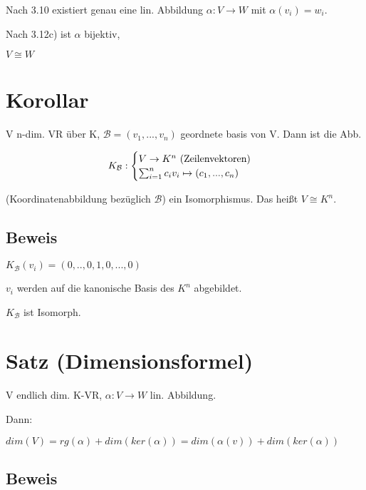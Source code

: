 \documentclass[a4paper, openany]{book}
\begin{document}
        Nach 3.10 existiert genau eine lin. Abbildung $\alpha : V \rightarrow W$ mit $\alpha(v_i) = w_i$.

        Nach 3.12c) ist $\alpha$ bijektiv,

        \begin{center}
          $V \cong W$
        \end{center}



        \section{Korollar}

        V n-dim. VR über K, $\mathcal{B} = (v_1, ..., v_n)$ geordnete basis von V. Dann ist die Abb. 

        \begin{equation}
          K_{\mathcal{B}} : \begin{cases}V \rightarrow K^n \textnormal{ (Zeilenvektoren)}\\ \sum_{i=1}^n c_i v_i \mapsto (c_1, ..., c_n) \end{cases}
        \end{equation}

        (Koordinatenabbildung bezüglich $\mathcal{B}$) ein Isomorphismus. Das heißt $V \cong K^n$.

        \subsection{Beweis}

        $K_{\mathcal{B}}(v_i) = (0,..,0,1,0,...,0)$

        $v_i$ werden auf die kanonische Basis des $K^n$ abgebildet.

        $K_{\mathcal{B}}$ ist Isomorph.

        \section{Satz (Dimensionsformel)}

        V endlich dim. K-VR, $\alpha: V \rightarrow W$ lin. Abbildung.

        Dann:

        $dim(V) = rg(\alpha) + dim(ker(\alpha)) = dim(\alpha(v)) + dim(ker(\alpha))$

        \subsection{Beweis}
\end{document}

